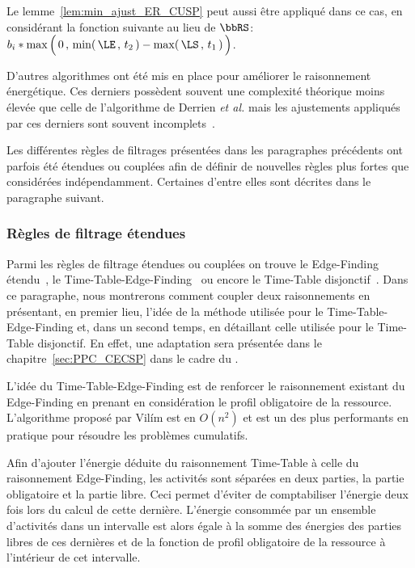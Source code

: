 Le lemme~\ref{lem:min_ajust_ER_CUSP} peut aussi être appliqué dans ce
cas, en considérant la fonction suivante au lieu de $\bbRS$:
$b_i*\max\Big(\, 0\, , \, \min(\, \LE\, ,\, t_2\,) - \max(\, \LS\, ,
  \, t_1\,) \,\Big)$. 

D'autres algorithmes ont été mis en place pour améliorer le
raisonnement énergétique. Ces derniers possèdent souvent une
complexité théorique moins élevée que celle de l'algorithme de Derrien
{\it et al.} mais les ajustements appliqués par ces derniers sont
souvent incomplets~\cite{Tesch2016,Berthold2011,Bonifas}.

Les différentes règles de filtrages présentées dans les paragraphes
précédents ont parfois été étendues ou couplées afin de définir de
nouvelles règles plus fortes que considérées indépendamment. Certaines
d'entre elles sont décrites dans le paragraphe suivant. 


\subsubsection{Règles de filtrage étendues}
\label{sec:mix_CUSP}

Parmi les règles de filtrage étendues ou couplées on trouve le
Edge-Finding étendu~\cite{ExtEF}, le 
Time-Table-Edge-Finding~\cite{V11} ou encore le Time-Table
disjonctif~\cite{Gay2015}. Dans ce paragraphe, nous montrerons comment
coupler deux raisonnements en présentant, en premier lieu, l'idée de
la méthode utilisée pour le Time-Table-Edge-Finding et, dans un second
temps, en détaillant celle utilisée pour le Time-Table disjonctif. En
effet, une adaptation sera présentée dans le
chapitre~\ref{sec:PPC_CECSP} dans le cadre du \CECSP.

L'idée du Time-Table-Edge-Finding est de renforcer le raisonnement
existant du Edge-Finding en prenant en considération le profil
obligatoire de la ressource. L'algorithme proposé par Vil{\'i}m est en
$O(n^2)$ et est un des plus performants en pratique pour résoudre les
problèmes cumulatifs. 

Afin d'ajouter l'énergie déduite du raisonnement Time-Table à celle du
raisonnement Edge-Finding, les activités sont séparées en deux
parties, la partie obligatoire et la partie libre. Ceci permet
d'éviter de comptabiliser l'énergie deux fois lors du calcul de cette
dernière. L'énergie consommée par un ensemble d'activités dans un
intervalle est alors égale à la somme des énergies des parties libres
de ces dernières et de la fonction de profil obligatoire de la
ressource à l'intérieur de cet intervalle. 

